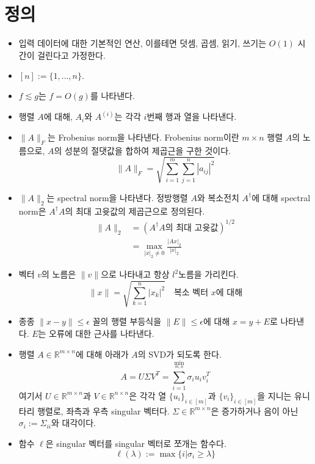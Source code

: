 \documentclass[a4paper,atbegshi,chapter]{oblivoir}
\begin{document}
\chapter{정의}
\begin{itemize}
  \item 입력 데이터에 대한 기본적인 연산, 이를테면 덧셈, 곱셈, 읽기, 쓰기는
$O(1)$ 시간이 걸린다고 가정한다.
\item $[n]:=\{1,\ldots,n\}.$
\item $f \lesssim g$는 $f=O(g)$를 나타낸다.
\item 행렬 $A$에 대해, $A_i$와 $A^{(i)}$는 각각 $i$번째 행과 열을 나타낸다. 
\item $\|A\|_F$는 Frobenius norm을 나타낸다. Frobenius norm이란 $m\times n$
  행렬 $A$의 노름으로, $A$의 성분의 절댓값을 합하여 제곱근을 구한 것이다.
  \[
    \|A\|_F = \sqrt{\sum_{i=1}^m\sum_{j=1}^n|a_{ij}|^2}
  \]
\item $\|A\|_2$는 spectral norm을 나타낸다. 정방행렬 $A$와 복소전치 
  $A^{\dagger}$에 대해 spectral norm은 $A^{\dagger}A$의 최대 고윳값의
  제곱근으로 정의된다.
  \begin{align*}
    \|A\|_2 &=  (A^{\dagger}A\textrm{의 최대 고윳값})^{1/2} \\
            &= \max_{|x|_2\neq0}\frac{|Ax|_2}{|x|_2}
  \end{align*}
\item 벡터 $v$의 노름은 $\|v\|$으로 나타내고 항상 $l^2$노름을 가리킨다.
  \[
    \|x\|=\sqrt{\sum_{k=1}^n|x_k|^2}\quad\textrm{복소 벡터 }x\textrm{에 대해}
  \]
\item 종종 $\|x-y\|\leq\epsilon$ 꼴의 행렬 부등식을 $\|E\|\leq\epsilon$에
  대해 $x=y+E$로 나타낸다. $E$는 오류에 대한 근사를 나타낸다.
\item 행렬 $A\in\mathbb{R}^{m\times n}$에 대해 아래가 $A$의 SVD가 되도록 한다.
  \[
    A = U\Sigma V^T = \sum_{i=1}^{\min_{m,n}}\sigma_i u_i v_i^{T}
  \]
  여기서 $U\in\mathbb{R}^{m\times n}$과 $V\in\mathbb{R}^{n\times n}$은 각각
  열 $\{u_i\}_{i\in[m]}$과 $\{v_i\}_{i\in[m]}$을 지니는 유니타리 행렬로,
  좌측과 우측 singular 벡터다. $\Sigma\in\mathbb{R}^{m\times n}$은
  증가하거나 음이 아닌 $\sigma_i:=\Sigma_{ii}$와 대각이다.
\item 함수 $\ell$은 singular 벡터를 singular 벡터로 쪼개는 함수다.
  \[
    \ell(\lambda):=\max\{i|\sigma_i\geq\lambda\}
  \]
\end{itemize}
\end{document}

